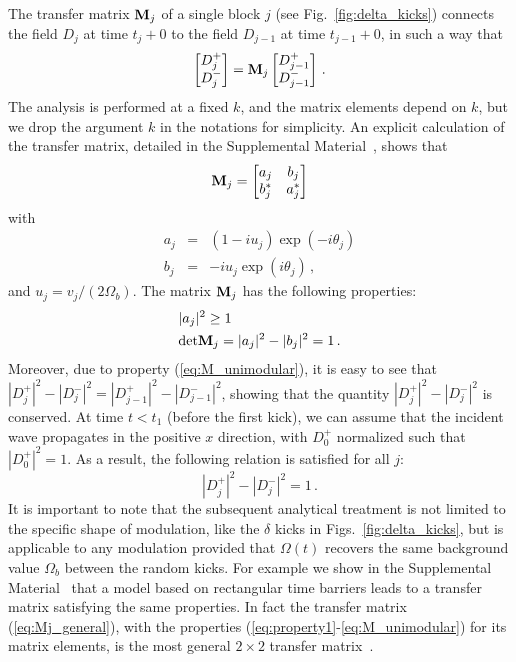 \documentclass[ prl, twocolumn, superscriptaddress, amsfonts, amsmath,floatfix]{revtex4-1}
\newcommand{\Mg}{{\bf M}}
\begin{document}
The transfer matrix $\Mg_j$ of a single block $j$ (see Fig.~\ref{fig:delta_kicks}) connects the field $D_j$ at time $t_j + 0$ to the field $D_{j-1}$ at time $t_{j-1}+0$, in such a way that
\begin{equation}
\begin{bmatrix}
D^+_j \\
D^-_j
\end{bmatrix}
=
\Mg_j
\begin{bmatrix}
D^+_{j-1} \\
D^-_{j-1}
\end{bmatrix} \, .
\label{eq:def_Mj}
\end{equation}
{The analysis is performed at a fixed $k$, and the matrix elements depend on $k$, but we drop the argument $k$ in the notations for simplicity.}
An explicit calculation of the transfer matrix, {detailed in the Supplemental Material~\cite{SM}}, shows that
\begin{equation}
\Mg_j
=
\begin{bmatrix}
a_j & b_j \\
b_j^* & a_j^*
\end{bmatrix}
\label{eq:Mj_general}
\end{equation}
with
\begin{eqnarray}
a_j &=&  (1-iu_j) \exp(-i\theta_j) \nonumber \\
b_j &=& -iu_j \exp(i\theta_j) \, ,  \label{eq:ajbj_kicks}
\end{eqnarray}
and $u_j=v_j/(2 \Omega_b)$. The matrix $\Mg_j$ has the following properties:
\begin{align}
&|a_j|^2 \geq 1
\label{eq:property1} \\
&\mathrm{det} \Mg_j = |a_j|^2 - |b_j|^2 = 1 \, .
\label{eq:M_unimodular}
\end{align}
Moreover, due to property (\ref{eq:M_unimodular}), it is easy to see that $|D_j^+|^2 - |D_j^-|^2 = |D_{j-1}^+|^2 - |D_{j-1}^-|^2$, showing that the quantity $|D_j^+|^2 - |D_j^-|^2$ is conserved. At time $t<t_1$ (before the first kick), we can assume that the incident wave propagates in the positive $x$ direction, with $D_0^+$ normalized such that $|D_0^+|^2=1$. As a result, the following relation is satisfied for all $j$:
\begin{equation}
|D_j^+|^2 - |D_j^-|^2 = 1 \, .
\label{eq:flux_conservation}
\end{equation}
It is important to note that the subsequent analytical treatment is not limited to the specific shape of modulation, like the $\delta$ kicks in Figs.~\ref{fig:delta_kicks}, but is applicable to any modulation provided that $\Omega(t)$ recovers the same background value $\Omega_b$ between the random kicks. {For example we show in the Supplemental Material~\cite{SM} that a model based on rectangular time barriers leads to a transfer matrix satisfying the same properties.} In fact the transfer matrix (\ref{eq:Mj_general}), with the properties (\ref{eq:property1}-\ref{eq:M_unimodular}) for its matrix elements, is the most general $2\times2$ transfer matrix~{\cite{MelloBook}}. 
\end{document}
